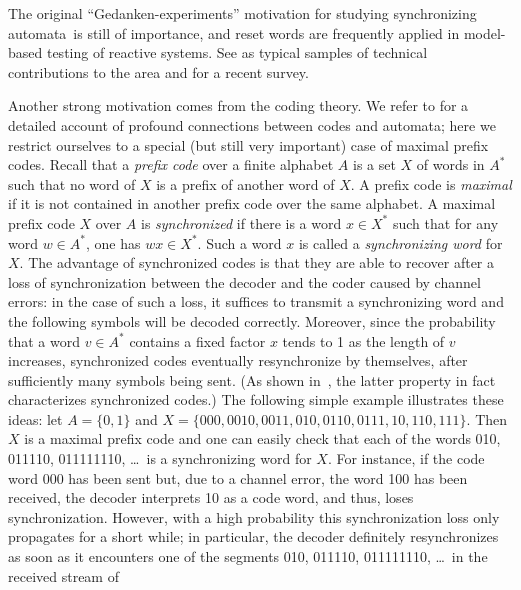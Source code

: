\documentclass{irmaart}
\newcommand{\sa}{synchronizing au\-tom\-a\-ta}
\begin{document}
The original ``Gedanken-experiments'' motivation for studying \sa\
is still of importance, and reset words are frequently applied in
model-based testing of reactive systems. See \cite{Cho&Jeong&Somenzi&Pixley:1993,
Boppana&Rajan&Takayama&Fujita:1999} as typical samples of technical
contributions to the area and \cite{Sandberg:2005} for a recent survey.

Another strong motivation comes from the coding theory. We refer
to \cite[Chapters~3 and~10]{Berstel&Perrin&Reutenauer:2009} for a
detailed account of profound connections between codes and
automata; here we restrict ourselves to a special (but still very
important) case of maximal prefix codes. Recall that a
\emph{prefix code} over a finite alphabet $A$
is a set $X$ of words in $A^*$ such that no word of $X$ is a
prefix of another word of $X$. A prefix code is
\emph{maximal} if it is not contained
in another prefix code over the same alphabet. A maximal prefix
code $X$ over $A$ is \emph{synchronized} if there is a word $x\in X^*$ such that for any
word $w\in A^*$, one has $wx\in X^*$. Such a word $x$ is called a
\emph{synchronizing word}\index{synchronizing word of a code} for
$X$. The advantage of synchronized codes is that they are able to
recover after a loss of synchronization between the decoder and
the coder caused by channel errors: in the case of such a loss, it
suffices to transmit a synchronizing word and the following
symbols will be decoded correctly. Moreover, since the probability
that a word $v\in A^*$ contains a fixed factor $x$ tends to 1 as
the length of $v$ increases, synchronized codes eventually
resynchronize by themselves, after sufficiently many symbols being
sent. (As shown in~\cite{Capocelli&Gargano&Vaccaro:1988}, the
latter property in fact characterizes synchronized codes.) The
following simple example illustrates these ideas: let $A=\{0,1\}$
and $X=\{000,0010,0011,010,0110,0111,10,110,111\}$. Then $X$ is a
maximal prefix code and one can easily check that each of the
words 010, 011110, 011111110, \dots\ is a synchronizing word for
$X$. For instance, if the code word 000 has been sent but, due to
a channel error, the word 100 has been received, the decoder
interprets 10 as a code word, and thus, loses synchronization.
However, with a high probability this synchronization loss only
propagates for a short while; in particular, the decoder
definitely resynchronizes as soon as it encounters one of the
segments 010, 011110, 011111110, \dots\ in the received stream of
\end{document}
